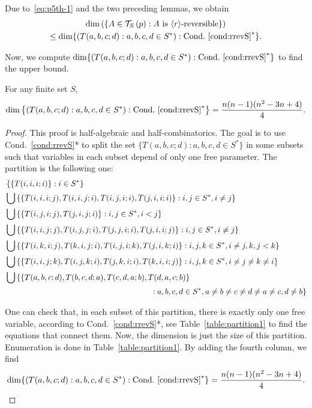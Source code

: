 \documentclass[AHL,Unicode,longabstracts]{cedram}
\DeclarePairedDelimiter{\vect}{\langle}{\rangle}
\newcounter{a}
\newcommand{\Cond}{Cond.}
\newcommand{\triang}[2]{\mathcal{T}_{#1} \left(#2 \right)}
\begin{document}
Due to~\eqref{eq:p5th-1} and the two preceding lemmas, we obtain
\begin{multline*}
\dim \left(\{A \in \triang{S}{p} :A \text{ is $\vect{r}$-reversible}\} \right) \\
\leq \dim \{(T(a,b,c;d) : a,b,c,d \in S^*) : \text{\Cond}~\ref{cond:rrevS}^*\}.
\end{multline*}

Now, we compute $\dim \{(T(a,b,c;d) : a,b,c,d \in S^*) : \text{\Cond}~\ref{cond:rrevS}^*\}$ to find the upper bound.

\begin{lemm}\label{lem:dim-5*}
For any finite set $S$,
\begin{equation*}
\dim \left\{(T(a,b,c;d) : a,b,c,d \in S^*) : \text{\Cond}~\ref{cond:rrevS}^*\right\} = \frac{n (n-1) (n^2-3n+4)}{4}.
\end{equation*}
\end{lemm}

\begin{proof}
This proof is half-algebraic and half-combinatorics. The goal is to use \Cond~\ref{cond:rrevS}* to split the set $\{T(a,b,c;d) : a,b,c,d \in S^*\}$ in some subsets such that variables in each subset depend of only one free parameter. The partition is the following one: {\small
\begin{align*}
& \left \{ \left\{ T(i,i,i;i) \right\}: i \in S^* \right\} \\
&\bigcup \left \{ \left\{ T(i,i,i;j), T(i,i,j;i), T(i,j,i;i), T(j,i,i;i) \right\}: i,j \in S^*, i \neq j \right\} \\
&\bigcup \left \{ \left\{ T(i,j,i;j), T(j,i,j;i) \right\}: i,j \in S^*, i<j \right\} \\
&\bigcup \left \{ \left\{ T(i,i,j;j), T(i,j,j;i), T(j,j,i;i), T(j,i,i;j) \right\}: i,j \in S^*, i \neq j \right\} \\
&\bigcup \left \{ \left\{ T(i,k,i;j), T(k,i,j;i), T(i,j,i;k), T(j,i,k;i) \right\}: i,j,k\in S^*,i\neq j,k,j<k \right\}\\
&\bigcup \left \{ \left\{ T(i,i,j;k), T(i,j,k;i), T(j,k,i;i), T(k,i,i;j) \right\}: i,j,k \in S^*, i \neq j \neq k \neq i \right\} \\
&\bigcup \left \{ \{ T(a,b,c;d), T(b,c,d;a), T(c,d,a;b), T(d,a,c;b) \right\}\\
&\mkern 330mu: a,b,c,d \in S^*, a \neq b \neq c \neq d \neq a \neq c, d \neq b \}
\end{align*}
}

One can check that, in each subset of this partition, there is exactly only one free variable, according to \Cond~\ref{cond:rrevS}*, see Table~\ref{table:partition1} to find the equations that connect them. Now, the dimension is just the size of this partition. Enumeration is done in Table~\ref{table:partition1}. By adding the fourth column, we find
\[
\dim \{(T(a,b,c;d) : a,b,c,d \in S^*) : \text{\Cond}~\ref{cond:rrevS}^*\} =  \frac{n (n-1) (n^2-3n+4)}{4}. \qedhere
\]
\end{proof}
\end{document}
